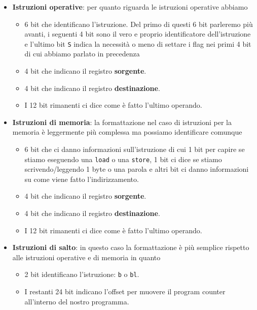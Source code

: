 \begin{itemize}
	\item \textbf{Istruzioni operative}: per quanto riguarda le istruzioni operative abbiamo
	      \begin{itemize}
		      \item 6 bit che identificano l'istruzione. Del primo di questi 6 bit parleremo più
		            avanti, i seguenti 4 bit sono il vero e proprio identificatore dell'istruzione
		            e l'ultimo bit \verb|S| indica la necessità o meno di settare i flag nei primi
		            4 bit di cui abbiamo parlato in precedenza
		      \item 4 bit che indicano il registro \textbf{sorgente}.
		      \item 4 bit che indicano il registro \textbf{destinazione}.
		      \item I 12 bit rimanenti ci dice come è fatto l'ultimo operando.
	      \end{itemize}
	\item \textbf{Istruzioni di memoria}: la formattazione nel caso di istruzioni per la memoria è
	      leggermente più complessa ma possiamo identificare comunque
	      \begin{itemize}
		      \item 6 bit che ci danno informazioni sull'istruzione di cui 1 bit per capire se
		            stiamo eseguendo una \verb|load| o una \verb|store|, 1 bit ci dice se stiamo
		            scrivendo/leggendo 1 byte o una parola e altri bit ci danno informazioni su
		            come viene fatto l'indirizzamento.
		      \item 4 bit che indicano il registro \textbf{sorgente}.
		      \item 4 bit che indicano il registro \textbf{destinazione}.
		      \item I 12 bit rimanenti ci dice come è fatto l'ultimo operando.
	      \end{itemize}
	\item \textbf{Istruzioni di salto}: in questo caso la formattazione è più semplice rispetto
	      alle istruzioni operative e di memoria in quanto
	      \begin{itemize}
		      \item 2 bit identificano l'istruzione: \verb|b| o \verb|bl|.
		      \item I restanti 24 bit indicano l'offset per muovere il program counter all'interno
		            del nostro programma.
	      \end{itemize}
\end{itemize}
